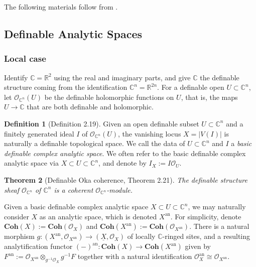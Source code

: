 \documentclass{amsart}
\newtheorem{theorem}{Theorem}[subsection]
\theoremstyle{definition}
\newtheorem{definition}[theorem]{Definition}
\numberwithin{equation}{section}
\newcommand{\analytic}{\mathrm{an}}
\begin{document}
The following materials follow from \cite{zbMATH07662555}.

\subsection{Definable Analytic Spaces}
\subsubsection{Local case}
Identify $\mathbb{C} = \mathbb{R}^2$ using the real and imaginary parts,
and give $\mathbb{C}$ the definable structure coming from the identification $\mathbb{C}^n = \mathbb{R}^{2n}$.
For a definable open $U \subset \mathbb{C}^n$,
let $\mathcal{O}_{\mathbb{C}^n}(U)$ be the definable holomorphic functions on $U$,
that is, the maps $U \to \mathbb{C}$ that are both definable and holomorphic.

\begin{definition}[Definition 2.19]
    Given an open definable subset $U \subset \mathbb{C}^n$ and 
    a finitely generated ideal $I$ of $\mathcal{O}_{\mathbb{C}^n}(U)$,
    the vanishing locus $X = |V(I)|$ is naturally a definable topological space.
    We call the data of $U \subset \mathbb{C}^n$ and $I$ a \emph{basic definable complex analytic space}.
    We often refer to the basic definable complex analytic space via $X \subset U \subset \mathbb{C}^n$,
    and denote by $I_X := I\mathcal{O}_U$.
\end{definition}

\begin{theorem}[Definable Oka coherence, Theorem 2.21]
    The definable structure sheaf $\mathcal{O}_{\mathbb{C}^n}$ of $\mathbb{C}^n$ is a coherent $\mathcal{O}_{\mathbb{C}^n}$-module.
\end{theorem}

Given a basic definable complex analytic space $X \subset U \subset \mathbb{C}^n$,
we may naturally consider $X$ as an analytic space,
which is denoted $X^{\analytic}$.
For simplicity, denote $\mathbf{Coh}(X) := \mathbf{Coh}(\mathcal{O}_X)$ and
$\mathbf{Coh}(X^{\analytic}) := \mathbf{Coh}(\mathcal{O}_{X^{\analytic}})$.
There is a natural morphism $g: (X^{\analytic},\mathcal{O}_{X^{\analytic}}) \to (\underline{X},\mathcal{O}_X)$
of locally $\mathbb{C}$-ringed sites,
and a resulting analytification functor $(-)^{\analytic}: \mathbf{Coh}(X) \to \mathbf{Coh}(X^{\analytic})$
given by $F^{\analytic} := \mathcal{O}_{X^{\analytic}} \otimes_{g^{-1}\mathcal{O}_X} g^{-1}F$ together with
a natural identification $\mathcal{O}_X^{\analytic} \cong \mathcal{O}_{X^{\analytic}}$.
\end{document}

